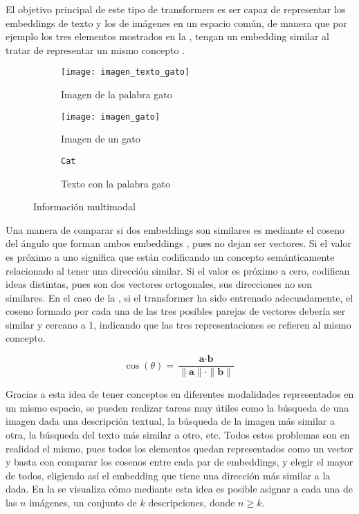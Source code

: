 			El objetivo principal de este tipo de transformers es ser capaz de representar los embeddings de texto y los de imágenes en un espacio común, de manera que por ejemplo los tres elementos mostrados en la , tengan un embedding similar al tratar de representar un mismo concepto \cite{multimodal_transformers}.
			
			\begin{figure}[!h]
				\centering
				\begin{subfigure}{.3\textwidth}
					\centering
					\texttt{[image: imagen\_texto\_gato]}
					\caption{Imagen de la palabra gato}
				\end{subfigure}\hfill
				\begin{subfigure}{.3\textwidth}
					\centering
					\texttt{[image: imagen\_gato]}
					\caption{Imagen de un gato}
				\end{subfigure}
				\begin{subfigure}{.3\textwidth}
					\begin{minipage}[position][2.5cm][c]{\textwidth}
						\centering
						\Large\texttt{Cat}
					\end{minipage}
					\caption{Texto con la palabra gato}
				\end{subfigure}
				\caption{Información multimodal \cite{vertex}}
				\label{fig:info_multi}
			\end{figure} 
			
			Una manera de comparar si dos embeddings son similares es mediante el coseno del ángulo que forman ambos embeddings \cite{cosine}, pues no dejan ser vectores. Si el valor es próximo a uno significa que están codificando un concepto semánticamente relacionado al tener una dirección similar. Si el valor es próximo a cero, codifican ideas distintas, pues son dos vectores ortogonales, sus direcciones no son similares. En el caso de la , si el transformer ha sido entrenado adecuadamente, el coseno formado por cada una de las tres posibles parejas de vectores debería ser similar y cercano a 1, indicando que las tres representaciones se refieren al mismo concepto. 
			
			$$
			\cos(\theta) = \frac{\textbf{a} \cdot \textbf{b}}{\|\textbf{a}\|\cdot\|\textbf{b}\|}
			$$
			
			Gracias a esta idea de tener conceptos en diferentes modalidades representados en un mismo espacio, se pueden realizar tareas muy útiles como la búsqueda de una imagen dada una descripción textual, la búsqueda de la imagen más similar a otra, la búsqueda del texto más similar a otro, etc. Todos estos problemas son en realidad el mismo, pues todos los elementos quedan representados como un vector y basta con comparar los cosenos entre cada par de embeddings, y elegir el mayor de todos, eligiendo así el embedding que tiene una dirección más similar a la dada. En la  se visualiza cómo mediante esta idea es posible asignar a cada una de las $n$ imágenes, un conjunto de $k$ descripciones, donde $n \geq k$. 
			
